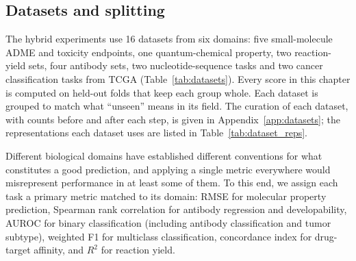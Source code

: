 \subsection{Datasets and splitting}

The hybrid experiments use 16 datasets from six domains: five small-molecule ADME and toxicity endpoints, one quantum-chemical property, two reaction-yield sets, four antibody sets, two nucleotide-sequence tasks and two cancer classification tasks from TCGA (Table~\ref{tab:datasets}). Every score in this chapter is computed on held-out folds that keep each group whole. Each dataset is grouped to match what ``unseen'' means in its field. The curation of each dataset, with counts before and after each step, is given in Appendix~\ref{app:datasets}; the representations each dataset uses are listed in Table~\ref{tab:dataset_reps}.

Different biological domains have established different conventions for what constitutes a good prediction, and applying a single metric everywhere would misrepresent performance in at least some of them. To this end, we assign each task a primary metric matched to its domain: RMSE for molecular property prediction, Spearman rank correlation for antibody regression and developability, AUROC for binary classification (including antibody classification and tumor subtype), weighted F1 for multiclass classification, concordance index for drug-target affinity, and $R^2$ for reaction yield.

